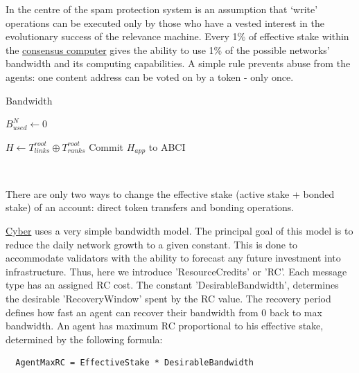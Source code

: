 \documentclass[8pt,oneside]{amsart}
\begin{document}
In the centre of the spam protection system is an assumption that ‘write’ operations can be executed only by those who have a vested interest in the evolutionary success of the relevance machine. Every 1\% of effective stake within the {\hyperref[consensus-computer]{consensus computer}} gives the ability to use 1\% of the possible networks' bandwidth and its computing capabilities. A simple rule prevents abuse from the agents: one content address can be voted on by a token - only once.

\begin{algorithm}
\caption{Bandwidth}\label{bandwidth-algo}
$B^{N}_{used} \leftarrow 0$\;

\BlankLine
$H \leftarrow T^{root}_{links} \oplus T^{root}_{ranks}$\;
Commit $H_{app}$ to ABCI\;
\end{algorithm}\

There are only two ways to change the effective stake (active stake + bonded stake) of an account: direct token transfers and bonding operations.

{\hyperref[cyber]{Cyber}} uses a very simple bandwidth model. The principal goal of this model is to reduce the daily network growth to a given constant. This is done to accommodate validators with the ability to forecast any future investment into infrastructure. Thus, here we introduce 'ResourceCredits' or 'RC'. Each message type has an assigned RC cost. The constant 'DesirableBandwidth', determines the desirable 'RecoveryWindow' spent by the RC value. The recovery period defines how fast an agent can recover their bandwidth from 0 back to max bandwidth. An agent has maximum RC proportional to his effective stake, determined by the following formula:

\begin{lstlisting}
  AgentMaxRC = EffectiveStake * DesirableBandwidth
\end{lstlisting}
\end{document}
